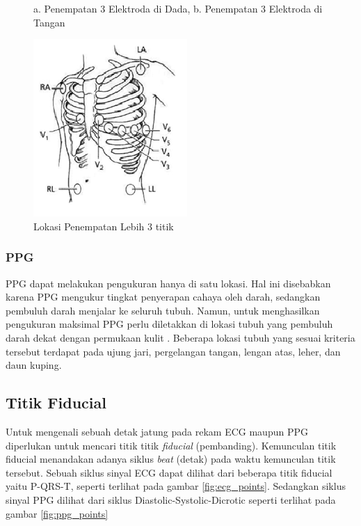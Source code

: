 \begin{figure}[H]
    \caption{a. Penempatan 3 Elektroda di Dada, b. Penempatan 3 Elektroda di Tangan}
    \label{fig:electrode3}
	\includegraphics[scale=0.8]{images/multi_ecg.png}
    \caption{Lokasi Penempatan Lebih 3 titik}
    \label{fig:multi_elctrode}
\end{figure}

\subsubsection{PPG}
PPG dapat melakukan pengukuran hanya di satu lokasi. Hal ini disebabkan karena PPG mengukur tingkat penyerapan cahaya oleh darah, sedangkan pembuluh darah menjalar ke seluruh tubuh. Namun, untuk menghasilkan pengukuran maksimal PPG perlu diletakkan di lokasi tubuh yang pembuluh darah dekat dengan permukaan kulit \cite{ppg_placement}\cite{ppg_placement2}. Beberapa lokasi tubuh yang sesuai kriteria tersebut terdapat pada ujung jari, pergelangan tangan, lengan atas, leher, dan daun kuping.


\subsection{Titik Fiducial}
Untuk mengenali sebuah detak jatung pada rekam ECG maupun PPG diperlukan untuk mencari titik titik \textit{fiducial} (pembanding). Kemunculan titik fiducial menandakan adanya siklus \textit{beat} (detak) pada waktu kemunculan titik tersebut. Sebuah siklus sinyal ECG dapat dilihat dari beberapa titik fiducial yaitu P-QRS-T, seperti terlihat pada gambar \ref{fig:ecg_points}. Sedangkan siklus sinyal PPG dilihat dari siklus Diastolic-Systolic-Dicrotic seperti terlihat pada gambar \ref{fig:ppg_points}

